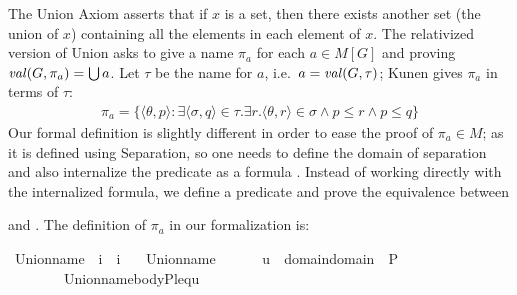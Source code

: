 The Union Axiom asserts that if $x$ is a set, then there exists
another set (the union of $x$) containing all the elements in each
element of $x$. The relativized version of Union asks to give a name
$\pi_a$ for each $a\in M[G]$ and proving $\operatorname{\mathit{val}}(G,\pi_a)=\mathop{\textstyle\bigcup} a$.
Let $\tau$ be the name for $a$, i.e.\ $a=\operatorname{\mathit{val}}(G,\tau)$; 
Kunen \cite{kunen2011set} gives $\pi_a$ in terms of $\tau$:
\begin{align*}
  \pi_a = \{\langle\theta,p \rangle :  %
\exists \langle\sigma,q\rangle  \in \tau .
 \exists r . \langle \theta,r\rangle \in \sigma \wedge
    p\leqslant r \wedge p \leqslant q \}
\end{align*}
Our formal definition is slightly different in order to ease the proof
of $\pi_a \in M$; as it is defined using Separation, so one needs to
define the domain of separation and also internalize the predicate as
a formula
. Instead of
working directly with the internalized formula, we define a predicate
 and prove the equivalence between
\begin{center}
\end{center}
and
. The
definition of $\pi_a$ in our formalization is:
\begin{isabelle}
\isamarkupfalse%
\ Union{\isacharunderscore}name\ {\isacharcolon}{\isacharcolon}\ {\isachardoublequoteopen}i\ {\isasymRightarrow}\ i{\isachardoublequoteclose}\ \isanewline
\ \ {\isachardoublequoteopen}Union{\isacharunderscore}name{\isacharparenleft}{\isasymtau}{\isacharparenright}\ {\isacharequal}{\isacharequal}\ \isanewline
\ \ \ \ {\isacharbraceleft}u\ {\isasymin}\ domain{\isacharparenleft}{\isasymUnion}{\isacharparenleft}domain{\isacharparenleft}{\isasymtau}{\isacharparenright}{\isacharparenright}{\isacharparenright}\ {\isasymtimes}\ P\ {\isachardot}\isanewline
\ \ \ \  \ \ \ \ Union{\isacharunderscore}name{\isacharunderscore}body{\isacharparenleft}P{\isacharcomma}leq{\isacharcomma}{\isasymtau}{\isacharcomma}u{\isacharparenright}{\isacharbraceright}{\isachardoublequoteclose}
\end{isabelle}

